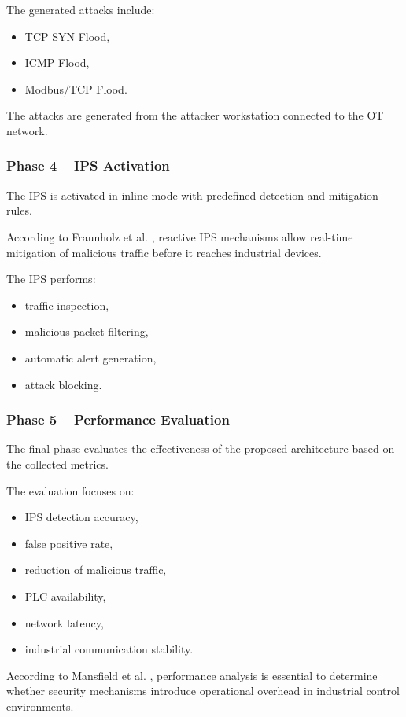 \documentclass[sigconf]{acmart}
\begin{document}
The generated attacks include:
\begin{itemize}
    \item TCP SYN Flood,
    \item ICMP Flood,
    \item Modbus/TCP Flood.
\end{itemize}

The attacks are generated from the attacker workstation connected to the OT network.

\subsubsection{Phase 4 -- IPS Activation}

The IPS is activated in inline mode with predefined detection and mitigation rules.

According to Fraunholz et al. \cite{fraunholz2018industrial}, reactive IPS mechanisms allow real-time mitigation of malicious traffic before it reaches industrial devices.

The IPS performs:
\begin{itemize}
    \item traffic inspection,
    \item malicious packet filtering,
    \item automatic alert generation,
    \item attack blocking.
\end{itemize}

\subsubsection{Phase 5 -- Performance Evaluation}

The final phase evaluates the effectiveness of the proposed architecture based on the collected metrics.

The evaluation focuses on:
\begin{itemize}
    \item IPS detection accuracy,
    \item false positive rate,
    \item reduction of malicious traffic,
    \item PLC availability,
    \item network latency,
    \item industrial communication stability.
\end{itemize}

According to Mansfield et al. \cite{mansfield2020threeTier}, performance analysis is essential to determine whether security mechanisms introduce operational overhead in industrial control environments.
\end{document}
